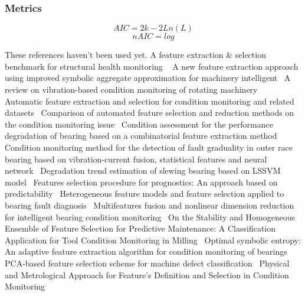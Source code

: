 \documentclass{article}
\begin{document}
\subsubsection{Metrics}
$$ AIC = 2k - 2Ln(L) $$  
$$ nAIC = log $$

These references haven't been used yet.
A feature extraction \& selection benchmark for structural health monitoring ~\cite{buckley2023feature}
A new feature extraction approach using improved symbolic aggregate approximation for machinery intelligent~\cite{zhang2019new}
A review on vibration-based condition monitoring of rotating machinery~\cite{tiboni2022review}
Automatic feature extraction and selection for condition monitoring and related datasets~\cite{schneider2018automatic}
Comparison of automated feature selection and reduction methods on the condition monitoring issue~\cite{de2018comparison}
Condition assessment for the performance degradation of bearing based on a combinatorial feature extraction method~\cite{hong2014condition}
Condition monitoring method for the detection of fault graduality in outer race bearing based on vibration-current fusion, statistical features and neural network~\cite{saucedo2021condition}
Degradation trend estimation of slewing bearing based on LSSVM model~\cite{lu2016degradation}
Features selection procedure for prognostics: An approach based on predictability~\cite{javed2012features}
Heterogeneous feature models and feature selection applied to bearing fault diagnosis~\cite{rauber2014heterogeneous}
Multifeatures fusion and nonlinear dimension reduction for intelligent bearing condition monitoring~\cite{guo2016multifeatures}
On the Stability and Homogeneous Ensemble of Feature Selection for Predictive Maintenance: A Classification Application for Tool Condition Monitoring in Milling~\cite{assafo2023stability}
Optimal symbolic entropy: An adaptive feature extraction algorithm for condition monitoring of bearings~\cite{li2023optimal}
PCA-based feature selection scheme for machine defect classification~\cite{malhi2004pca}
Physical and Metrological Approach for Feature’s Definition and Selection in Condition Monitoring~\cite{d2019physical}

\clearpage  
\end{document}
